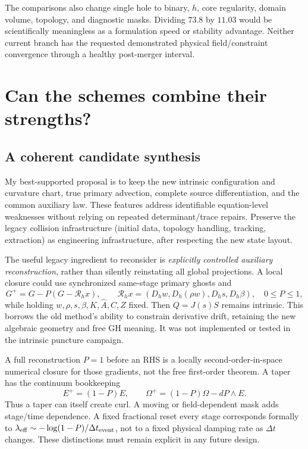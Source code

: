 \documentclass[11pt,letterpaper]{article}
\begin{document}
The comparisons also change single hole to binary, $h$, core regularity, domain volume, topology, and diagnostic masks. Dividing $73.8$ by $11.03$ would be scientifically meaningless as a formulation speed or stability advantage. Neither current branch has the requested demonstrated physical field/constraint convergence through a healthy post-merger interval.

\section{Can the schemes combine their strengths?}
\subsection{A coherent candidate synthesis}
My best-supported proposal is to keep the new intrinsic configuration and curvature chart, true primary advection, complete source differentiation, and the common auxiliary law. These features address identifiable equation-level weaknesses without relying on repeated determinant/trace repairs. Preserve the legacy collision infrastructure (initial data, topology handling, tracking, extraction) as engineering infrastructure, after respecting the new state layout.

The useful legacy ingredient to reconsider is \emph{explicitly controlled auxiliary reconstruction}, rather than silently reinstating all global projections. A local closure could use synchronized same-stage primary ghosts and
\begin{equation}
G^+=G-P(G-\mathcal R_hx),\qquad
\mathcal R_hx=(D_hw,D_h(\rho w),D_hs,D_h\beta),\quad 0\le P\le1,
\end{equation}
while holding $w,\rho,s,\beta,K,\widehat A,C,Z$ fixed. Then $Q=J(s)S$ remains intrinsic. This borrows the old method's ability to constrain derivative drift, retaining the new algebraic geometry and free GH meaning. It was not implemented or tested in the intrinsic puncture campaign.

A full reconstruction $P=1$ before an RHS is a locally second-order-in-space numerical closure for those gradients, not the free first-order theorem. A taper has the continuum bookkeeping
\begin{equation}
E^+=(1-P)E,\qquad \Omega^+=(1-P)\Omega-dP\wedge E.
\end{equation}
Thus a taper can itself create curl. A moving or field-dependent mask adds stage/time dependence. A fixed fractional reset every stage corresponds formally to $\lambda_{\rm eff}\sim-\log(1-P)/\Delta t_{\rm event}$, not to a fixed physical damping rate as $\Delta t$ changes. These distinctions must remain explicit in any future design.
\end{document}

